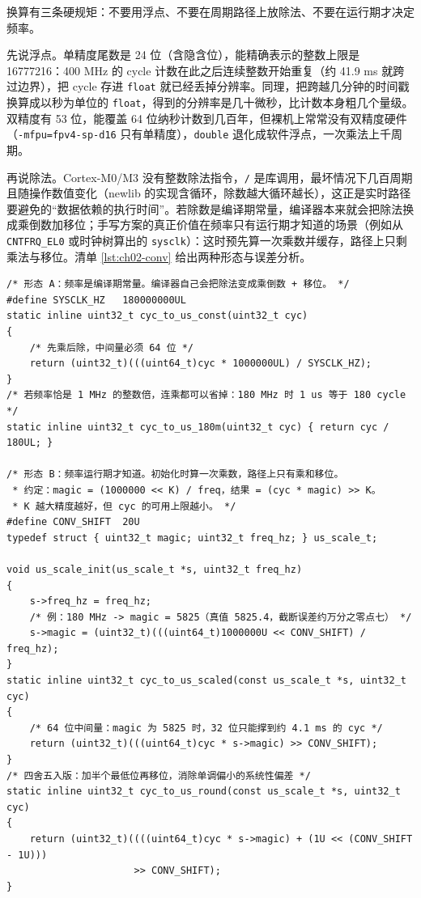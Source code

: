 \documentclass[12pt,a4paper,fontset=fandol]{ctexbook}
\newcommand{\Tp}[1]{\texttt{#1}}
\begin{document}
\label{sec:ch02-scale}

换算有三条硬规矩：不要用浮点、不要在周期路径上放除法、不要在运行期才决定频率。

先说浮点。单精度尾数是 24 位（含隐含位），能精确表示的整数上限是 16777216：400 MHz 的 cycle 计数在此之后连续整数开始重复（约 41.9 ms 就跨过边界），把 cycle 存进 \Tp{float} 就已经丢掉分辨率。同理，把跨越几分钟的时间戳换算成以秒为单位的 \Tp{float}，得到的分辨率是几十微秒，比计数本身粗几个量级。双精度有 53 位，能覆盖 64 位纳秒计数到几百年，但裸机上常常没有双精度硬件（\Tp{-mfpu=fpv4-sp-d16} 只有单精度），\Tp{double} 退化成软件浮点，一次乘法上千周期。

再说除法。Cortex-M0/M3 没有整数除法指令，\Tp{/} 是库调用，最坏情况下几百周期且随操作数值变化（newlib 的实现含循环，除数越大循环越长），这正是实时路径要避免的``数据依赖的执行时间''。若除数是编译期常量，编译器本来就会把除法换成乘倒数加移位；手写方案的真正价值在频率只有运行期才知道的场景（例如从 \Tp{CNTFRQ\_EL0} 或时钟树算出的 \Tp{sysclk}）：这时预先算一次乘数并缓存，路径上只剩乘法与移位。清单 \ref{lst:ch02-conv} 给出两种形态与误差分析。

\begin{lstlisting}[style=cstyle,caption={cycle 到微秒的定点换算：常量频率与运行期频率两种形态},label={lst:ch02-conv}]
/* 形态 A：频率是编译期常量。编译器自己会把除法变成乘倒数 + 移位。 */
#define SYSCLK_HZ   180000000UL
static inline uint32_t cyc_to_us_const(uint32_t cyc)
{
    /* 先乘后除，中间量必须 64 位 */
    return (uint32_t)(((uint64_t)cyc * 1000000UL) / SYSCLK_HZ);
}
/* 若频率恰是 1 MHz 的整数倍，连乘都可以省掉：180 MHz 时 1 us 等于 180 cycle */
static inline uint32_t cyc_to_us_180m(uint32_t cyc) { return cyc / 180UL; }

/* 形态 B：频率运行期才知道。初始化时算一次乘数，路径上只有乘和移位。
 * 约定：magic = (1000000 << K) / freq，结果 = (cyc * magic) >> K。
 * K 越大精度越好，但 cyc 的可用上限越小。 */
#define CONV_SHIFT  20U
typedef struct { uint32_t magic; uint32_t freq_hz; } us_scale_t;

void us_scale_init(us_scale_t *s, uint32_t freq_hz)
{
    s->freq_hz = freq_hz;
    /* 例：180 MHz -> magic = 5825（真值 5825.4，截断误差约万分之零点七） */
    s->magic = (uint32_t)(((uint64_t)1000000U << CONV_SHIFT) / freq_hz);
}
static inline uint32_t cyc_to_us_scaled(const us_scale_t *s, uint32_t cyc)
{
    /* 64 位中间量：magic 为 5825 时，32 位只能撑到约 4.1 ms 的 cyc */
    return (uint32_t)(((uint64_t)cyc * s->magic) >> CONV_SHIFT);
}
/* 四舍五入版：加半个最低位再移位，消除单调偏小的系统性偏差 */
static inline uint32_t cyc_to_us_round(const us_scale_t *s, uint32_t cyc)
{
    return (uint32_t)((((uint64_t)cyc * s->magic) + (1U << (CONV_SHIFT - 1U)))
                      >> CONV_SHIFT);
}
\end{lstlisting}
\end{document}
